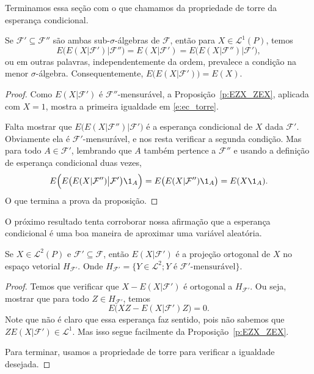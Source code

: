 Terminamos essa seção com o que chamamos da propriedade de torre da esperança condicional.

\begin{proposition}
  Se $\mathcal{F}' \subseteq \mathcal{F}''$ são ambas sub-$\sigma$-álgebras de $\mathcal{F}$, então para $X \in \mathcal{L}^1(P)$, temos
  \begin{equation}
    \label{e:ec_torre}
    E\big( E(X|\mathcal{F}') \big| \mathcal{F}'' \big) = E(X|\mathcal{F}') = E\big( E(X|\mathcal{F}'') \big| \mathcal{F}' \big),
  \end{equation}
  ou em outras palavras, independentemente da ordem, prevalece a condição na menor $\sigma$-álgebra.
  Consequentemente, $E\big( E(X|\mathcal{F}') \big) = E(X)$.
\end{proposition}

\begin{proof}
  Como $E(X|\mathcal{F}')$ é $\mathcal{F}''$-mensurável, a Proposição~\ref{p:EZX_ZEX}, aplicada com $X = 1$, mostra a primeira igualdade em \eqref{e:ec_torre}.

  Falta mostrar que $E\big( E(X|\mathcal{F}'') \big| \mathcal{F}'\big)$ é a esperança condicional de $X$ dada $\mathcal{F}'$.
  Obviamente ela é $\mathcal{F}'$-mensurável, e nos resta verificar a segunda condição.
  Mas para todo $A \in \mathcal{F}'$, lembrando que $A$ também pertence a $\mathcal{F}''$ e usando a definição de esperança condicional duas vezes,
  \begin{equation}
    E\Big( E\big( E(X|\mathcal{F}'') \big| \mathcal{F}' \big) \1_A \Big) = E\big( E(X | \mathcal{F}'')  \1_A \big) = E(X \1_A).
  \end{equation}
  O que termina a prova da proposição.
\end{proof}

O próximo resultado tenta corroborar nossa afirmação que a esperança condicional é uma boa maneira de aproximar uma variável aleatória.

\begin{lemma}
  Se $X \in \mathcal{L}^2(P)$ e $\mathcal{F}' \subseteq \mathcal{F}$, então $E(X|\mathcal{F}')$ é a projeção ortogonal de $X$ no espaço vetorial $H_{\mathcal{F}'}$.
  Onde $H_{\mathcal{F}'} = \{Y \in \mathcal{L}^2; Y \text{ é $\mathcal{F}'$-mensurável}\}$.
\end{lemma}

\begin{proof}
  Temos que verificar que $X - E(X|\mathcal{F}')$ é ortogonal a $H_{\mathcal{F}'}$.
  Ou seja, mostrar que para todo $Z \in H_{\mathcal{F}'}$, temos
  \begin{equation}
    E\big( XZ - E(X|\mathcal{F}') Z \big) = 0.
  \end{equation}
  Note que não é claro que essa esperança faz sentido, pois não sabemos que $ZE(X|\mathcal{F}') \in \mathcal{L}^1$.
  Mas isso segue facilmente da Proposição~\ref{p:EZX_ZEX}.

  Para terminar, usamos a propriedade de torre para verificar a igualdade desejada.
\end{proof}

